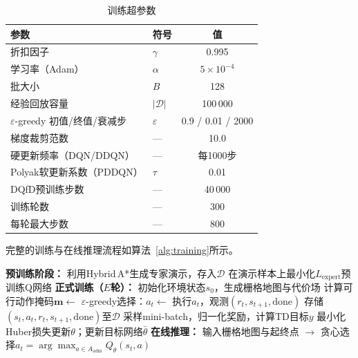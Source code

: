 \documentclass[twocolumn]{elsarticle}
\begin{document}
\begin{table}[t]
\centering
\caption{训练超参数}
\label{tab:hyperparams}
\footnotesize
\begin{tabular}{@{}llc@{}}
\toprule
\textbf{参数} & \textbf{符号} & \textbf{值} \\
\midrule
折扣因子 & $\gamma$ & 0.995 \\
学习率（Adam） & $\alpha$ & $5\times10^{-4}$ \\
批大小 & $B$ & 128 \\
经验回放容量 & $|\mathcal{D}|$ & 100\,000 \\
$\varepsilon$-greedy 初值/终值/衰减步 & $\varepsilon$ & 0.9 / 0.01 / 2000 \\
梯度裁剪范数 & --- & 10.0 \\
硬更新频率（DQN/DDQN） & --- & 每1000步 \\
Polyak软更新系数（PDDQN） & $\tau$ & 0.01 \\
DQfD预训练步数 & --- & 40\,000 \\
训练轮数 & --- & 300 \\
每轮最大步数 & --- & 800 \\
\bottomrule
\end{tabular}
\end{table}

完整的训练与在线推理流程如算法~\ref{alg:training}所示。

\begin{algorithm}[t]
\caption{约束感知DRL运动规划——训练与推理}
\label{alg:training}
\begin{algorithmic}[1]
\State \textbf{预训练阶段：}
\State 利用Hybrid\,A*生成专家演示，存入$\mathcal{D}$
\State 在演示样本上最小化$L_{\text{expert}}$预训练Q网络
\State \textbf{正式训练（$E$轮）：}
  \State 初始化环境状态$s_0$，生成栅格地图与代价场
    \State 计算可行动作掩码$\mathbf{m} \gets$ 
    \State $\varepsilon$-greedy选择：$a_t \gets$ 
    \State 执行$a_t$，观测$(r_t, s_{t+1}, \text{done})$
    \State 存储$(s_t, a_t, r_t, s_{t+1}, \text{done})$至$\mathcal{D}$
    \State 采样mini-batch，归一化奖励，计算TD目标$y$
    \State 最小化Huber损失更新$\theta$；更新目标网络$\bar{\theta}$
  \EndFor
\EndFor
\State \textbf{在线推理：}
\State 输入栅格地图与起终点 $\to$ 贪心选择$a_t = \arg\max_{a \in A_{\text{adm}}} Q_\theta(s_t, a)$
\end{algorithmic}
\end{algorithm}
\end{document}
